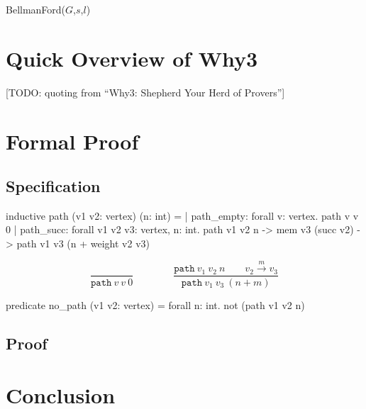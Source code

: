 \documentclass[a4paper,12pt]{article}
\begin{document}
\begin{algorithm}
\caption{BellmanFord($G$,$s$,$l$)}
\begin{algorithmic}
\ENDFOR
\ENDFOR
{}
\ENDIF
\ENDFOR
{}
\end{algorithmic}
\end{algorithm}


\section{Quick Overview of Why3}

[TODO: quoting from ``Why3: Shepherd Your Herd of Provers'']

\section{Formal Proof}

\subsection{Specification}

\begin{why3}
  inductive path (v1 v2: vertex) (n: int) =
    | path_empty:
        forall v: vertex. path v v 0
    | path_succ:
        forall v1 v2 v3: vertex, n: int.
        path v1 v2 n -> mem v3 (succ v2) -> path v1 v3 (n + weight v2 v3)
\end{why3}

\begin{displaymath}
  \frac{}
       {\mathtt{path}~v~v~0}
  \qquad\qquad
  \frac{\mathtt{path}~v_1~v_2~n \qquad v_2\stackrel{m}{\to} v_3}
       {\mathtt{path}~v_1~v_3~(n + m)}
\end{displaymath}

\begin{why3}
  predicate no_path (v1 v2: vertex) =
    forall n: int. not (path v1 v2 n)
\end{why3}

\subsection{Proof}

\section{Conclusion}
\end{document}
